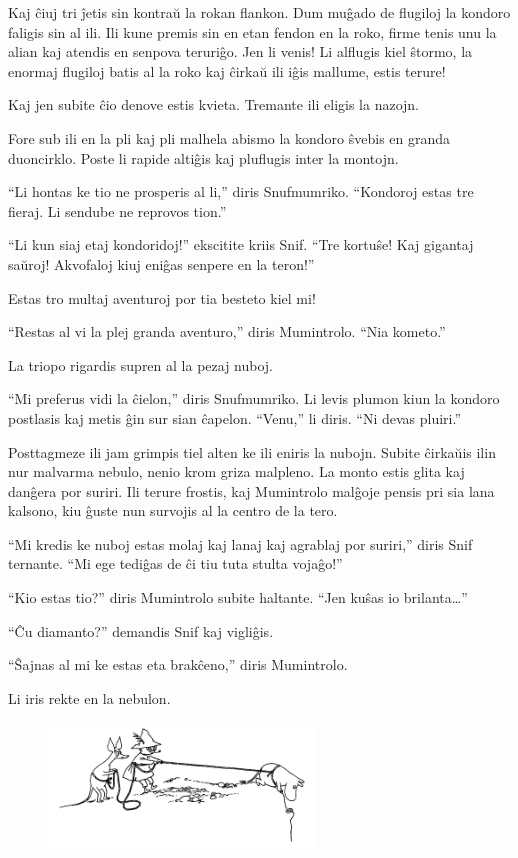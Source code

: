 Kaj ĉiuj tri ĵetis sin kontraŭ la rokan flankon. Dum muĝado de flugiloj la kondoro faligis sin al ili. Ili kune premis sin en etan fendon en la roko, firme tenis unu la alian kaj atendis en senpova teruriĝo. Jen li venis! Li alflugis kiel ŝtormo, la enormaj flugiloj batis al la roko kaj ĉirkaŭ ili iĝis mallume, estis terure!

Kaj jen subite ĉio denove estis kvieta. Tremante ili eligis la nazojn.

Fore sub ili en la pli kaj pli malhela abismo la kondoro ŝvebis en granda duoncirklo. Poste li rapide altiĝis kaj pluflugis inter la montojn.

``Li hontas ke tio ne prosperis al li,'' diris Snufmumriko. ``Kondoroj estas tre fieraj. Li sendube ne reprovos tion.''

``Li kun siaj etaj kondoridoj!'' ekscitite kriis Snif. ``Tre kortuŝe! Kaj gigantaj saŭroj! Akvofaloj kiuj eniĝas senpere en la teron!''

Estas tro multaj aventuroj por tia besteto kiel mi!

``Restas al vi la plej granda aventuro,'' diris Mumintrolo. ``Nia kometo.''

La triopo rigardis supren al la pezaj nuboj.

``Mi preferus vidi la ĉielon,'' diris Snufmumriko. Li levis plumon kiun la kondoro postlasis kaj metis ĝin sur sian ĉapelon. ``Venu,'' li diris. ``Ni devas pluiri.''

Posttagmeze ili jam grimpis tiel alten ke ili eniris la nubojn. Subite ĉirkaŭis ilin nur malvarma nebulo, nenio krom griza malpleno. La monto estis glita kaj danĝera por suriri. Ili terure frostis, kaj Mumintrolo malĝoje pensis pri sia lana kalsono, kiu ĝuste nun survojis al la centro de la tero.

``Mi kredis ke nuboj estas molaj kaj lanaj kaj agrablaj por suriri,'' diris Snif ternante. ``Mi ege tediĝas de ĉi tiu tuta stulta vojaĝo!''

``Kio estas tio?'' diris Mumintrolo subite haltante. ``Jen kuŝas io brilanta{\ldots}''

``Ĉu diamanto?'' demandis Snif kaj vigliĝis.

``Ŝajnas al mi ke estas eta brakĉeno,'' diris Mumintrolo.

Li iris rekte en la nebulon.

\begin{figure}
\includegraphics[width=200pt,height=96pt]{4-3.png}\end{figure}

